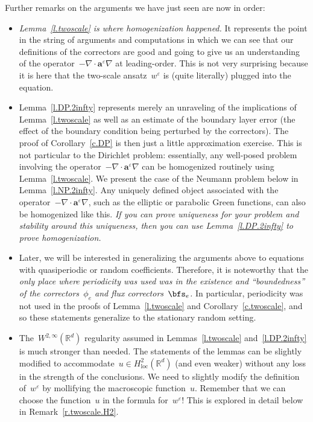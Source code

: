 \documentclass[11pt,twoside]{article} %
\numberwithin{equation}{section}
\theoremstyle{definition}
\newcommand*{\Rd}{\ensuremath{\mathbb{R}^d}}
\newcommand{\eps}{\varepsilon}
\newcommand{\ep}{\eps}
\renewcommand{\a}{\mathbf{a}}
\begin{document}
Further remarks on the arguments we have just seen are now in order:

\begin{itemize}

\item \emph{Lemma~\ref{l.twoscale} is where homogenization happened.} It represents the point in the string of arguments and computations in which we can see that our definitions of the correctors are good and going to give us an understanding of the operator~$-\nabla \cdot \a^\ep\nabla$ at leading-order. This is not very surprising because it is here that the two-scale ansatz~$w^\ep$ is (quite literally) plugged into the equation. 

\item Lemma~\ref{l.DP.2infty} represents merely an unraveling of the implications of Lemma~\ref{l.twoscale} as well as an estimate of the boundary layer error (the effect of the boundary condition being perturbed by the correctors). The proof of Corollary~\ref{c.DP} is then just a little approximation exercise. 
This is not particular to the Dirichlet problem: essentially, any well-posed problem involving the operator~$-\nabla \cdot \a^\ep \nabla$ can be homogenized routinely using Lemma~\ref{l.twoscale}. We present the case of the Neumann problem below in Lemma~\ref{l.NP.2infty}. Any uniquely defined object associated with the operator~$-\nabla \cdot \a^\ep \nabla$, such as the elliptic or parabolic Green functions, can also be homogenized like this. \emph{If you can prove uniqueness for your problem and stability around this uniqueness, then you can use Lemma~\ref{l.DP.2infty} to prove homogenization.}

\item 
Later, we will be interested in generalizing the arguments above to equations with quasiperiodic or random coefficients. Therefore, it is noteworthy that the \emph{only place where periodicity was used was in the existence and ``boundedness'' of the correctors~$\phi_e$ and flux correctors~$\bfs_e$.} In particular, periodicity was not used in the proofs of Lemma~\ref{l.twoscale} and Corollary~\ref{c.twoscale}, and so these statements generalize to the stationary random setting. 


\item
The~$W^{2,\infty}(\Rd)$ regularity assumed in Lemmas~\ref{l.twoscale} and~\ref{l.DP.2infty} is much stronger than needed. The statements of the lemmas can be slightly modified to accommodate~$u\in H^2_{\mathrm{loc}}(\Rd)$ (and even weaker) without any loss in the strength of the conclusions. We need to slightly modify the definition of~$w^\ep$ by mollifying the macroscopic function~$u$. Remember that we can choose the function~$u$ in the formula for~$w^\ep$! This is explored in detail below in Remark~\ref{r.twoscale.H2}.


\end{itemize}
\end{document}

